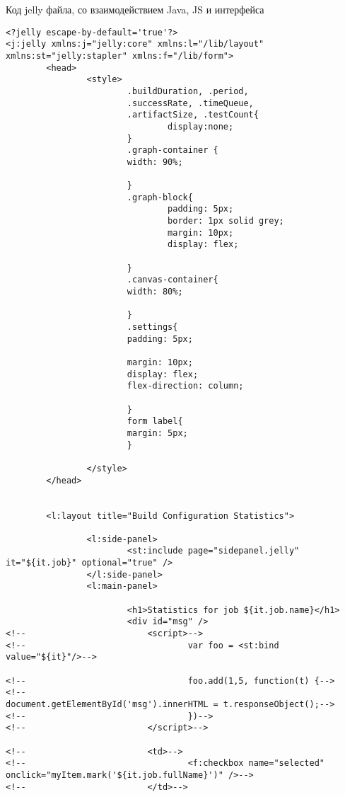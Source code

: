 Код jelly файла, со взаимодействием Java, JS и интерфейса

\begin{lstlisting}
<?jelly escape-by-default='true'?>
<j:jelly xmlns:j="jelly:core" xmlns:l="/lib/layout" xmlns:st="jelly:stapler" xmlns:f="/lib/form">
        <head>
                <style>
                        .buildDuration, .period,
                        .successRate, .timeQueue,
                        .artifactSize, .testCount{
                                display:none;
                        }
                        .graph-container {
                        width: 90%;

                        }
                        .graph-block{
                                padding: 5px;
                                border: 1px solid grey;
                                margin: 10px;
                                display: flex;

                        }
                        .canvas-container{
                        width: 80%;

                        }
                        .settings{
                        padding: 5px;

                        margin: 10px;
                        display: flex;
                        flex-direction: column;

                        }
                        form label{
                        margin: 5px;
                        }

                </style>
        </head>


        <l:layout title="Build Configuration Statistics">

                <l:side-panel>
                        <st:include page="sidepanel.jelly" it="${it.job}" optional="true" />
                </l:side-panel>
                <l:main-panel>

                        <h1>Statistics for job ${it.job.name}</h1>
                        <div id="msg" />
<!--                        <script>-->
<!--                                var foo = <st:bind value="${it}"/>-->

<!--                                foo.add(1,5, function(t) {-->
<!--                                document.getElementById('msg').innerHTML = t.responseObject();-->
<!--                                })-->
<!--                        </script>-->

<!--                        <td>-->
<!--                                <f:checkbox name="selected" onclick="myItem.mark('${it.job.fullName}')" />-->
<!--                        </td>-->


\end{lstlisting}

